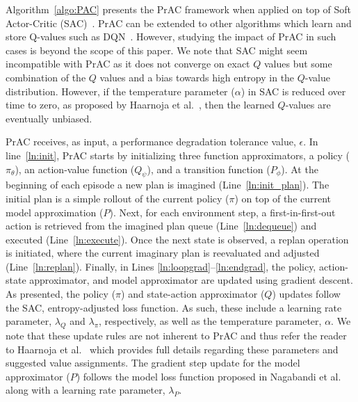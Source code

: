 \documentclass[letterpaper]{article} %
\begin{document}
        Algorithm~\ref{algo:PAC} presents the PrAC framework when applied on top of Soft Actor-Critic (SAC)~\cite{haarnoja2018soft}. PrAC can be extended to other algorithms which learn and store Q-values such as DQN~\cite{mnih2015human}. However, studying the impact of PrAC in such cases is beyond the scope of this paper. We note that SAC might seem incompatible with PrAC as it does not converge on exact $Q$ values but some combination of the $Q$ values and a bias towards high entropy in the $Q$-value distribution. However, if the temperature parameter ($\alpha$) in SAC is reduced over time to zero, as proposed by Haarnoja et al.~\citeyear{haarnoja2018soft}, then the learned $Q$-values are eventually unbiased.  

        PrAC receives, as input, a performance degradation tolerance value, $\epsilon$. In line~\ref{ln:init}, PrAC starts by initializing three function approximators, a policy ($\pi_\theta$), an action-value function ($Q_\psi$), and a transition function ($P_\phi$).  
        At the beginning of each episode a new plan is imagined (Line~\ref{ln:init_plan}). The initial plan is a simple rollout of the current policy ($\pi$) on top of the current model approximation ($P$). Next, for each environment step, a first-in-first-out action is retrieved from the imagined plan queue (Line~\ref{ln:dequeue}) and executed (Line~\ref{ln:execute}). Once the next state is observed, a replan operation is initiated, where the current imaginary plan is reevaluated and adjusted (Line~\ref{ln:replan}). Finally, in Lines \ref{ln:loopgrad}--\ref{ln:endgrad}, the policy, action-state approximator, and model approximator are updated using gradient descent. As presented, the policy ($\pi$) and state-action approximator ($Q$) updates follow the SAC, entropy-adjusted loss function. As such, these include a learning rate parameter, $\lambda_Q$ and $\lambda_\pi$, respectively, as well as the temperature parameter, $\alpha$. We note that these update rules are not inherent to PrAC and thus refer the reader to Haarnoja et al.~\citeyear{haarnoja2018soft} which provides full details regarding these parameters and suggested value assignments.
        The gradient step update for the model approximator ($P$) follows the model loss function proposed in Nagabandi et al.~\citeyear{nagabandi2018neural} along with a learning rate parameter, $\lambda_P$.    %
\end{document}
